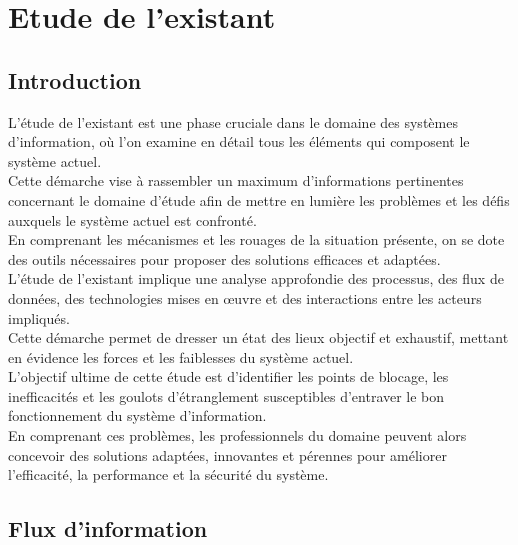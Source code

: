 \chapter{Etude de l'existant}
\section{Introduction}
    L'étude de l'existant est une phase cruciale dans le domaine des systèmes d'information,
    où l'on examine en détail tous les éléments qui composent le système actuel.\\
    Cette démarche vise à rassembler un maximum d'informations pertinentes concernant 
    le domaine d'étude afin de mettre en lumière les problèmes et les défis auxquels le système actuel est confronté.\\
    En comprenant les mécanismes et les rouages de la situation présente, 
    on se dote des outils nécessaires pour proposer des solutions efficaces et adaptées.\\
    L'étude de l'existant implique une analyse approfondie des processus, des flux de données,
    des technologies mises en œuvre et des interactions entre les acteurs impliqués.\\
    Cette démarche permet de dresser un état des lieux objectif et exhaustif,
    mettant en évidence les forces et les faiblesses du système actuel.\\
    L'objectif ultime de cette étude est d'identifier les points de blocage, 
    les inefficacités et les goulots d'étranglement susceptibles d'entraver le bon fonctionnement du système d'information.\\
    En comprenant ces problèmes, les professionnels du domaine peuvent alors concevoir des solutions adaptées, 
    innovantes et pérennes pour améliorer l'efficacité, la performance et la sécurité du système.\\
\section{Flux d’information}
